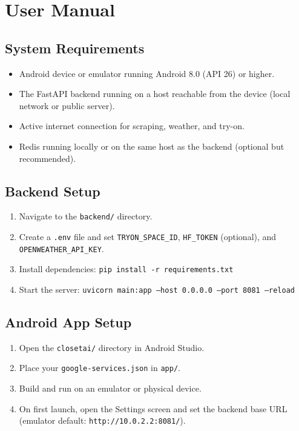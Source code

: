 \documentclass[12pt,a4paper]{report}
\begin{document}
\chapter{User Manual}

\section{System Requirements}

\begin{itemize}
  \item Android device or emulator running Android 8.0 (API 26) or higher.
  \item The FastAPI backend running on a host reachable from the device (local network or public server).
  \item Active internet connection for scraping, weather, and try-on.
  \item Redis running locally or on the same host as the backend (optional but recommended).
\end{itemize}

\section{Backend Setup}

\begin{enumerate}
  \item Navigate to the \texttt{backend/} directory.
  \item Create a \texttt{.env} file and set \texttt{TRYON\_SPACE\_ID}, \texttt{HF\_TOKEN} (optional), and \texttt{OPENWEATHER\_API\_KEY}.
  \item Install dependencies: \texttt{pip install -r requirements.txt}
  \item Start the server: \texttt{uvicorn main:app --host 0.0.0.0 --port 8081 --reload}
\end{enumerate}

\section{Android App Setup}

\begin{enumerate}
  \item Open the \texttt{closetai/} directory in Android Studio.
  \item Place your \texttt{google-services.json} in \texttt{app/}.
  \item Build and run on an emulator or physical device.
  \item On first launch, open the Settings screen and set the backend base URL (emulator default: \texttt{http://10.0.2.2:8081/}).
\end{enumerate}
\end{document}
